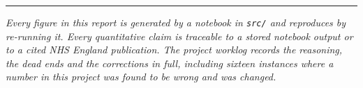 \documentclass[11pt,a4paper]{article}
\begin{document}
\vspace{1em}
\hrule
\vspace{0.6em}
{\small\emph{Every figure in this report is generated by a notebook in \texttt{src/} and reproduces by
re-running it. Every quantitative claim is traceable to a stored notebook output or to a cited NHS
England publication. The project worklog records the reasoning, the dead ends and the corrections in
full, including sixteen instances where a number in this project was found to be wrong and was
changed.}}
\end{document}
